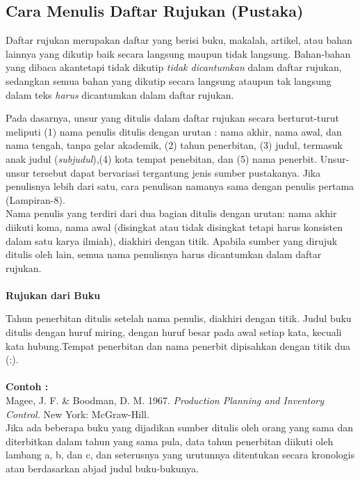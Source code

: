 \subsection{Cara	Menulis	Daftar	Rujukan (Pustaka)}
Daftar	rujukan	merupakan	daftar	yang	berisi	buku,	makalah,	artikel,	atau	bahan	lainnya	yang	dikutip	 baik	 secara	 langsung	 maupun tidak	 langsung.	 Bahan-bahan	 yang	 dibaca	 akantetapi	tidak	dikutip	\textit{tidak	dicantumkan} 	dalam	daftar	rujukan,	sedangkan	semua	bahan	yang	dikutip	secara	langsung	ataupun	 tak	langsung	dalam	 teks \textit{harus} dicantumkan	dalam	daftar	 rujukan.	

Pada	 dasarnya,	 unsur	 yang	 ditulis	 dalam	 daftar	 rujukan	 secara	 berturut-turut	 	meliputi	 (1)	nama	penulis	ditulis	dengan	urutan	:	nama	akhir,	nama	awal,	dan	nama	 tengah,	 tanpa	gelar	akademik,	 (2)	 tahun	 penerbitan,	 (3)	judul,	 termasuk	 anak	judul	(\textit{subjudul}),(4)	 kota	 tempat	
penebitan,	 dan	 (5)	 nama	 penerbit.	 Unsur-unsur	 tersebut	 dapat	 bervariasi	 tergantung	 jenis	sumber	 pustakanya.	 Jika	 penulisnya	 lebih	 dari	 satu,	 cara	 penulisan	 namanya	 sama	 dengan	penulis	pertama	(Lampiran-8). \\

Nama	 penulis	 yang	 terdiri	 dari	 dua	 bagian	 ditulis	 dengan	 urutan:	 nama	 akhir	 diikuti	 koma,	nama	 awal	 (disingkat	 atau	 tidak	 disingkat	 tetapi	 harus	 konsisten	 dalam	 satu	 karya	ilmiah), diakhiri	dengan	 titik.	Apabila	sumber	yang	dirujuk	ditulis	oleh	lain,	semua	nama	penulisnya	harus	dicantumkan	dalam	daftar	rujukan.
\\
\\

\textbf{Rujukan dari Buku} \par


Tahun	 penerbitan	 ditulis	 setelah	 nama	 penulis,	 diakhiri	 dengan	 titik.	 Judul	 buku	 ditulis	dengan	 huruf	 miring,	 dengan	 huruf	 besar	 pada	 awal	 setiap	 kata,	 kecuali	 kata	
hubung.Tempat	penerbitan	dan	nama	penerbit	dipisahkan	dengan	titik	dua	(:). \\
\\
\textbf{Contoh :} \\
Magee,	J.	F.	\&	Boodman,	D.	M.	1967. \textit{Production	Planning	and	Inventory	Control.}	New	York: McGraw-Hill. \\
Jika	 ada	 beberapa	 buku	 yang	 dijadikan	 sumber	 ditulis	 oleh	 orang	 yang	 sama	 dan	diterbitkan	dalam	tahun	yang	sama	pula,	data	tahun	penerbitan	diikuti	oleh	lambang	a,	b,	
dan	 c,	 dan	 seterusnya	 yang	 urutunnya	 ditentukan	 secara	 kronologis	 atau	 berdasarkan	abjad	judul	buku-bukunya. \\
\\

